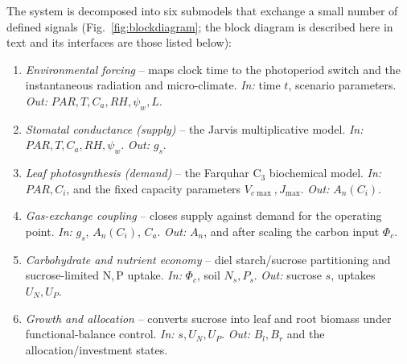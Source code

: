 \documentclass[a4paper,fleqn]{cas-sc}
\begin{document}
The system is decomposed into six submodels that exchange a small number of
defined signals (Fig.~\ref{fig:blockdiagram}; the block diagram is
described here in text and its interfaces are those listed below):

\begin{enumerate}\itemsep2pt
\item[\textbf{S1}] \emph{Environmental forcing} -- maps clock time to the
      photoperiod switch and the instantaneous radiation and micro-climate.
      \emph{In:} time $t$, scenario parameters. \emph{Out:}
      $\mathit{PAR},T,C_a,\mathit{RH},\psi_w,L$.
\item[\textbf{S2}] \emph{Stomatal conductance (supply)} -- the Jarvis
      multiplicative model. \emph{In:} $\mathit{PAR},T,C_a,\mathit{RH},
      \psi_w$. \emph{Out:} $g_s$.
\item[\textbf{S3}] \emph{Leaf photosynthesis (demand)} -- the Farquhar
      C$_3$ biochemical model. \emph{In:} $\mathit{PAR},C_i$, and the fixed
      capacity parameters $V_{c\max},J_{\max}$. \emph{Out:} $A_n(C_i)$.
\item[\textbf{S4}] \emph{Gas-exchange coupling} -- closes supply against
      demand for the operating point. \emph{In:} $g_s$, $A_n(C_i)$, $C_a$.
      \emph{Out:} $A_n$, and after scaling the carbon input $\Phi_c$.
\item[\textbf{S5}] \emph{Carbohydrate and nutrient economy} -- diel
      starch/sucrose partitioning and sucrose-limited N,\,P uptake.
      \emph{In:} $\Phi_c$, soil $N_s,P_s$. \emph{Out:} sucrose $s$, uptakes
      $U_N,U_P$.
\item[\textbf{S6}] \emph{Growth and allocation} -- converts sucrose into
      leaf and root biomass under functional-balance control. \emph{In:}
      $s,U_N,U_P$. \emph{Out:} $B_l,B_r$ and the allocation/investment
      states.
\end{enumerate}
\end{document}
